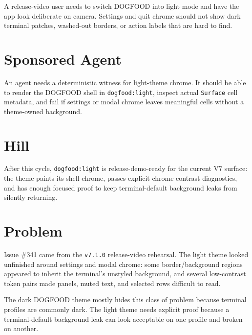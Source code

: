 A release-video user needs to switch DOGFOOD into light mode and have the app look deliberate on camera. Settings and quit chrome should not show dark terminal patches, washed-out borders, or action labels that are hard to find.

\section{Sponsored Agent}\label{record-182-sponsored-agent}

An agent needs a deterministic witness for light-theme chrome. It should be able to render the DOGFOOD shell in \texttt{d\allowbreak{}o\allowbreak{}g\allowbreak{}f\allowbreak{}o\allowbreak{}o\allowbreak{}d\allowbreak{}:\allowbreak{}l\allowbreak{}i\allowbreak{}g\allowbreak{}h\allowbreak{}t}, inspect actual \texttt{S\allowbreak{}u\allowbreak{}r\allowbreak{}f\allowbreak{}a\allowbreak{}c\allowbreak{}e} cell metadata, and fail if settings or modal chrome leaves meaningful cells without a theme-owned background.

\section{Hill}\label{record-182-hill}

After this cycle, \texttt{d\allowbreak{}o\allowbreak{}g\allowbreak{}f\allowbreak{}o\allowbreak{}o\allowbreak{}d\allowbreak{}:\allowbreak{}l\allowbreak{}i\allowbreak{}g\allowbreak{}h\allowbreak{}t} is release-demo-ready for the current V7 surface: the theme paints its shell chrome, passes explicit chrome contrast diagnostics, and has enough focused proof to keep terminal-default background leaks from silently returning.

\section{Problem}\label{record-182-problem}

Issue \#341 came from the \texttt{v\allowbreak{}7\allowbreak{}.\allowbreak{}1\allowbreak{}.\allowbreak{}0} release-video rehearsal. The light theme looked unfinished around settings and modal chrome: some border/background regions appeared to inherit the terminal's unstyled background, and several low-contrast token pairs made panels, muted text, and selected rows difficult to read.

The dark DOGFOOD theme mostly hides this class of problem because terminal profiles are commonly dark. The light theme needs explicit proof because a terminal-default background leak can look acceptable on one profile and broken on another.

